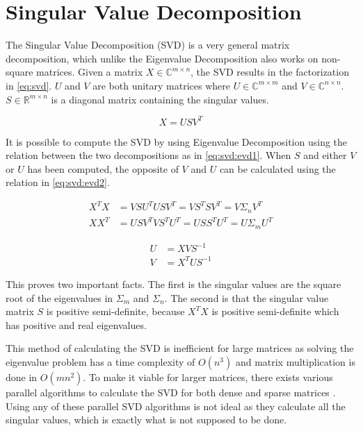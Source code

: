 \section{Singular Value Decomposition}

The Singular Value Decomposition (SVD) is a very general matrix decomposition, which unlike the Eigenvalue Decomposition also works on non-square matrices. Given a matrix $X \in \mathbb{C}^{m \times n}$, the SVD results in the factorization in \eqref{eq:svd}. $U$ and $V$ are both unitary matrices where $U \in \mathbb{C}^{m \times m}$ and $V \in \mathbb{C}^{n \times n}$. $S \in \mathbb{R}^{m \times n}$ is a diagonal matrix containing the singular values.

\begin{equation} \label{eq:svd}
    X = USV^T
\end{equation}

It is possible to compute the SVD by using Eigenvalue Decomposition using the relation between the two decompositions as in \eqref{eq:svd:evd1}. When $S$ and either $V$ or $U$ has been computed, the opposite of $V$ and $U$ can be calculated using the relation in \eqref{eq:svd:evd2}.
 
\begin{equation} \label{eq:svd:evd1}
\begin{split} 
    X^T X &= VSU^T USV^T = VS^T SV^T = V \Sigma_n V^T \\
    X X^T &= USV^T VS^TU^T = US S^TU^T = U \Sigma_m U^T
\end{split}
\end{equation}

\begin{equation} \label{eq:svd:evd2}
\begin{split} 
    U &= X V S^{-1} \\
    V &= X^T U S^{-1}
\end{split}
\end{equation}

This proves two important facts. The first is the singular values are the square root of the eigenvalues in $\Sigma_m$ and $\Sigma_n$. The second is that the singular value matrix $S$ is positive semi-definite, because $X^T X$ is positive semi-definite which has positive and real eigenvalues.

This method of calculating the SVD is inefficient for large matrices as solving the eigenvalue problem has a time complexity of $O(n^3)$ and matrix multiplication is done in $O(mn^2)$. To make it viable for larger matrices, there exists various parallel algorithms to calculate the SVD for both dense and sparse matrices \cite[Chapter~4]{erricos:handbook}. Using any of these parallel SVD algorithms is not ideal as they calculate all the singular values, which is exactly what is not supposed to be done.

